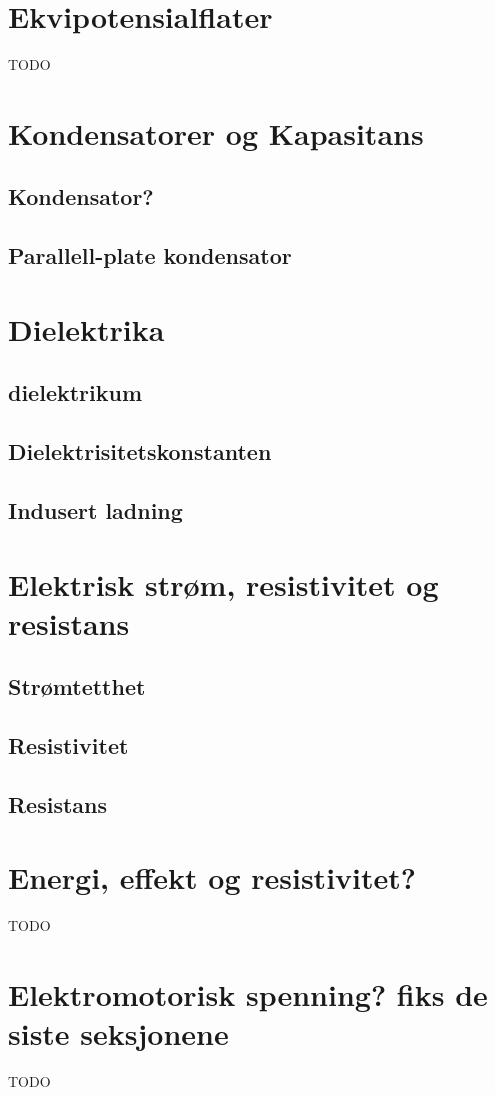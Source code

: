 \documentclass{article}
\begin{document}
  \section{Ekvipotensialflater}
    TODO
  \section{Kondensatorer og Kapasitans}
    \subsection{Kondensator?}
      
    \subsection{Parallell-plate kondensator}
      
  \section{Dielektrika}
    \subsection{dielektrikum}
      
    \subsection{Dielektrisitetskonstanten}
      
    \subsection{Indusert ladning}
      
  \section{Elektrisk strøm, resistivitet og resistans}
    \subsection{Strømtetthet}
      
    \subsection{Resistivitet}
      
    \subsection{Resistans}
      
  \section{Energi, effekt og resistivitet?}
    TODO
  \section{Elektromotorisk spenning? fiks de siste seksjonene}
    TODO
\end{document}
